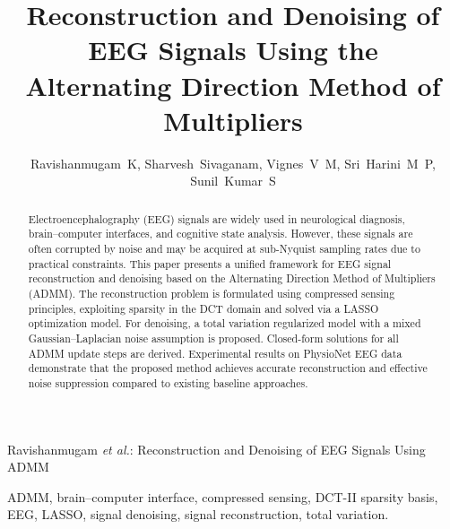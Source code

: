 \documentclass[journal,twoside,10pt]{IEEEtran}
\begin{document}
%
{Ravishanmugam \MakeLowercase{\textit{et al.}}: Reconstruction and Denoising of EEG Signals Using ADMM}

\title{Reconstruction and Denoising of EEG Signals Using the\\
Alternating Direction Method of Multipliers}

\author{
Ravishanmugam~K,
Sharvesh~Sivaganam,
Vignes~V~M,
Sri~Harini~M~P,
Sunil~Kumar~S%
}

\maketitle

\begin{abstract}
Electroencephalography (EEG) signals are widely used in neurological diagnosis, brain--computer interfaces, and cognitive state analysis. However, these signals are often corrupted by noise and may be acquired at sub-Nyquist sampling rates due to practical constraints. This paper presents a unified framework for EEG signal reconstruction and denoising based on the Alternating Direction Method of Multipliers (ADMM). The reconstruction problem is formulated using compressed sensing principles, exploiting sparsity in the DCT domain and solved via a LASSO optimization model. For denoising, a total variation regularized model with a mixed Gaussian--Laplacian noise assumption is proposed. Closed-form solutions for all ADMM update steps are derived. Experimental results on PhysioNet EEG data demonstrate that the proposed method achieves accurate reconstruction and effective noise suppression compared to existing baseline approaches.
\end{abstract}

\begin{IEEEkeywords}
ADMM, brain--computer interface, compressed sensing, DCT-II sparsity basis, EEG,
LASSO, signal denoising, signal reconstruction, total variation.
\end{IEEEkeywords}
\end{document}
